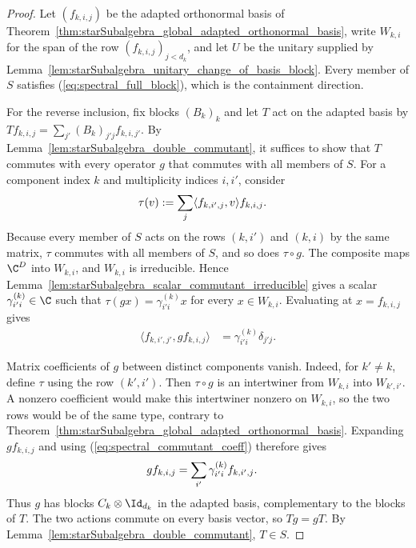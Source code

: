\begin{proof}
    \leanok
    Let $(f_{k,i,j})$ be the adapted orthonormal basis of
    Theorem~\ref{thm:starSubalgebra_global_adapted_orthonormal_basis}, write
    $W_{k,i}$ for the span of the row $(f_{k,i,j})_{j<d_k}$, and let $U$ be
    the unitary supplied by
    Lemma~\ref{lem:starSubalgebra_unitary_change_of_basis_block}. Every
    member of $S$ satisfies (\ref{eq:spectral_full_block}), which is the
    containment direction.

    For the reverse inclusion, fix blocks $(B_k)_k$ and let $T$ act on the
    adapted basis by
    $Tf_{k,i,j}=\sum_{j'}(B_k)_{j'j}f_{k,i,j'}$. By
    Lemma~\ref{lem:starSubalgebra_double_commutant}, it suffices to show that
    $T$ commutes with every operator $g$ that commutes with all members of
    $S$. For a component index $k$ and multiplicity indices $i,i'$, consider
    \begin{align}
        \tau(v)
        &:=\sum_j\langle f_{k,i',j},v\rangle f_{k,i,j}.
        \notag
    \end{align}
    Because every member of $S$ acts on the rows $(k,i')$ and $(k,i)$ by
    the same matrix, $\tau$ commutes with all members of $S$, and so does
    $\tau\circ g$. The composite maps $\C^D$ into $W_{k,i}$, and
    $W_{k,i}$ is irreducible. Hence
    Lemma~\ref{lem:starSubalgebra_scalar_commutant_irreducible} gives a
    scalar $\gamma^{(k)}_{i'i}\in\C$ such that
    $\tau(gx)=\gamma^{(k)}_{i'i}x$ for every $x\in W_{k,i}$. Evaluating at
    $x=f_{k,i,j}$ gives
    \begin{align}
        \langle f_{k,i',j'},g f_{k,i,j}\rangle
        &=\gamma^{(k)}_{i'i}\delta_{j'j}.
        \label{eq:spectral_commutant_coeff}
    \end{align}

    Matrix coefficients of $g$ between distinct components vanish. Indeed,
    for $k'\neq k$, define $\tau$ using the row $(k',i')$. Then
    $\tau\circ g$ is an intertwiner from $W_{k,i}$ into $W_{k',i'}$. A
    nonzero coefficient would make this intertwiner nonzero on $W_{k,i}$,
    so the two rows would be of the same type, contrary to
    Theorem~\ref{thm:starSubalgebra_global_adapted_orthonormal_basis}.
    Expanding $gf_{k,i,j}$ and using
    (\ref{eq:spectral_commutant_coeff}) therefore gives
    \begin{align}
        g f_{k,i,j}
        &=\sum_{i'}\gamma^{(k)}_{i'i}f_{k,i',j}.
        \notag
    \end{align}
    Thus $g$ has blocks $C_k\otimes\Id_{d_k}$ in the adapted basis,
    complementary to the blocks of $T$. The two actions commute on every
    basis vector, so $Tg=gT$. By
    Lemma~\ref{lem:starSubalgebra_double_commutant}, $T\in S$.


\end{proof}
